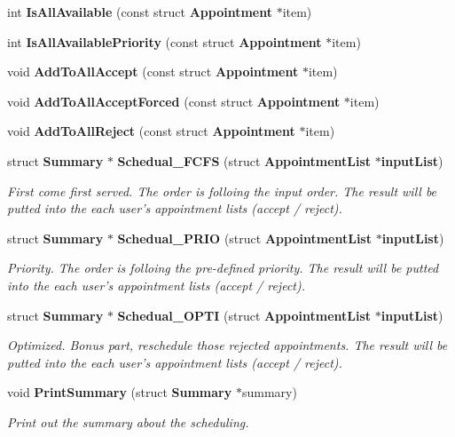 \begin{DoxyCompactItemize}
\item 
int {\bf Is\+All\+Available} (const struct {\bf Appointment} $\ast$item)
\item 
int {\bf Is\+All\+Available\+Priority} (const struct {\bf Appointment} $\ast$item)
\item 
void {\bf Add\+To\+All\+Accept} (const struct {\bf Appointment} $\ast$item)
\item 
void {\bf Add\+To\+All\+Accept\+Forced} (const struct {\bf Appointment} $\ast$item)
\item 
void {\bf Add\+To\+All\+Reject} (const struct {\bf Appointment} $\ast$item)
\item 
struct {\bf Summary} $\ast$ {\bf Schedual\+\_\+\+F\+C\+F\+S} (struct {\bf Appointment\+List} $\ast${\bf input\+List})
\begin{DoxyCompactList}\small\item\em First come first served. The order is folloing the input order. The result will be putted into the each user's appointment lists (accept / reject). \end{DoxyCompactList}\item 
struct {\bf Summary} $\ast$ {\bf Schedual\+\_\+\+P\+R\+I\+O} (struct {\bf Appointment\+List} $\ast${\bf input\+List})
\begin{DoxyCompactList}\small\item\em Priority. The order is folloing the pre-\/defined priority. The result will be putted into the each user's appointment lists (accept / reject). \end{DoxyCompactList}\item 
struct {\bf Summary} $\ast$ {\bf Schedual\+\_\+\+O\+P\+T\+I} (struct {\bf Appointment\+List} $\ast${\bf input\+List})
\begin{DoxyCompactList}\small\item\em Optimized. Bonus part, reschedule those rejected appointments. The result will be putted into the each user's appointment lists (accept / reject). \end{DoxyCompactList}\item 
void {\bf Print\+Summary} (struct {\bf Summary} $\ast$summary)
\begin{DoxyCompactList}\small\item\em Print out the summary about the scheduling. \end{DoxyCompactList}\end{DoxyCompactItemize}


